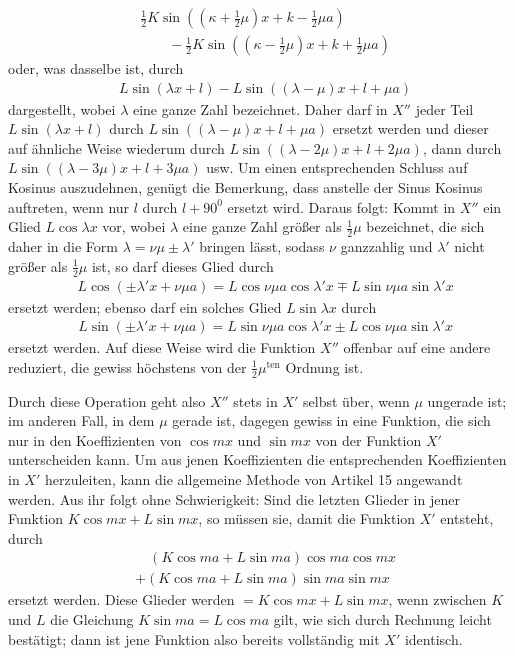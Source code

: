 \[
\begin{aligned}
&\frac12K\sin((\kappa+\frac12\mu)x+k-\frac12\mu a)\\[5pt]&\qquad{}-\frac12K\sin((\kappa-\frac12\mu)x+k+\frac12\mu a)
\end{aligned}
\]
oder, was dasselbe ist, durch
\[
\begin{aligned}
&L\sin(\lambda x+l)-L\sin((\lambda-\mu)x+l+\mu a)
\end{aligned}
\]
dargestellt, wobei $\lambda$ eine ganze Zahl bezeichnet. Daher darf in $X''$ jeder Teil $L\sin(\lambda x+l)$ durch $L\sin((\lambda-\mu)x+l+\mu a)$ ersetzt werden und dieser auf ähnliche Weise wiederum durch
$L\sin((\lambda-2\mu)x+l+2\mu a)$, dann durch $L\sin((\lambda-3\mu)x+l+3\mu a)$ usw. Um einen entsprechenden Schluss auf Kosinus auszudehnen, genügt die Bemerkung, dass anstelle der Sinus Kosinus auftreten,
wenn nur $l$ durch $l+90^{0}$ ersetzt wird. 
Daraus folgt: Kommt in $X''$ ein Glied
$L\cos\lambda x$ vor, wobei $\lambda$ eine ganze Zahl größer als $\frac12\mu$ bezeichnet, die sich daher in die Form
$\lambda=\nu\mu\pm\lambda'$ bringen lässt, sodass $\nu$ ganzzahlig und $\lambda'$ nicht größer als $\frac12\mu$ ist, so darf dieses Glied durch
\[
\begin{aligned}
&L\cos(\pm\lambda'x+\nu\mu a)=L\cos\nu\mu a\cos\lambda'x\mp L\sin\nu\mu a\sin\lambda'x
\end{aligned}
\]
ersetzt werden; ebenso darf ein solches Glied $L\sin\lambda x$ durch
\[
\begin{aligned}
&L\sin(\pm\lambda'x+\nu\mu a)=L\sin\nu\mu a\cos\lambda'x\pm L\cos\nu\mu a\sin\lambda'x
\end{aligned}
\]
ersetzt werden. Auf diese Weise wird die Funktion $X''$ offenbar auf eine andere reduziert, die gewiss höchstens von der
$\frac12\mu^{\mathrm{ten}}$ Ordnung ist.

Durch diese Operation geht also $X''$ stets in $X'$ selbst über, wenn $\mu$
ungerade ist; im anderen Fall, in dem $\mu$ gerade ist, dagegen gewiss in eine Funktion, die
sich nur in den Koeffizienten von $\cos mx$ und $\sin mx$ von der Funktion $X'$ unterscheiden
kann. Um aus jenen Koeffizienten die entsprechenden Koeffizienten in $X'$ herzuleiten, kann die allgemeine Methode von Artikel 15 angewandt werden. Aus ihr folgt ohne Schwierigkeit: Sind
die letzten Glieder in jener Funktion $K\cos mx+L\sin mx$, so müssen sie, damit die Funktion $X'$ entsteht, durch
\[
\begin{aligned}
&\quad(K\cos ma+L\sin ma)\cos ma\cos mx\\[5pt]
&+(K\cos ma+L\sin ma)\sin ma\sin mx
\end{aligned}
\]
ersetzt werden. Diese Glieder werden $=K\cos mx+L\sin mx$, wenn zwischen $K$ und $L$ die Gleichung $K\sin ma=L\cos ma$
gilt, wie sich durch Rechnung leicht bestätigt; dann ist jene Funktion also bereits vollständig mit $X'$ identisch.
\endgroup

